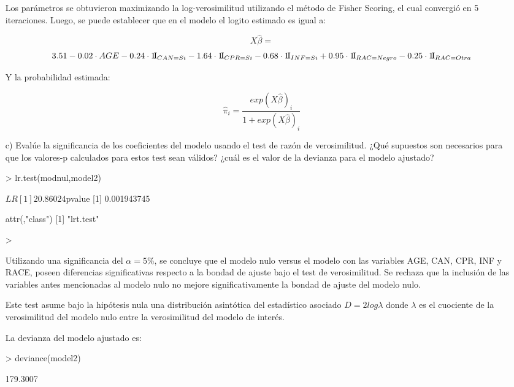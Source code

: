 \documentclass[11pt,onside]{article}
\begin{document}
\begin{itemize}
Los parámetros se obtuvieron maximizando la log-verosimilitud utilizando el método de Fisher Scoring, el cual convergió en 5 iteraciones. Luego, se puede establecer que en el modelo el logito estimado es igual a:

$$X \hat{\beta}=$$
$$3.51-0.02\cdot AGE-0.24\cdot \leavevmode\hbox{1\!\rm I}_{CAN=Si} -1.64 \cdot \leavevmode\hbox{1\!\rm I}_{CPR=Si}-0.68 \cdot \leavevmode\hbox{1\!\rm I}_{INF=Si}+0.95 \cdot \leavevmode\hbox{1\!\rm I}_{RAC=Negro}-0.25 \cdot \leavevmode\hbox{1\!\rm I}_{RAC=Otra}$$


Y la probabilidad estimada:

$$\hat{\pi}_{i}=\frac{exp(X \hat{\beta})_{i}} {1+exp(X \hat{\beta})_{i}}$$


\item[c)] Evalúe la significancia de los coeficientes del modelo usando el test de razón de verosimilitud. ¿Qué supuestos son necesarios para que los valores-p calculados para estos test sean válidos? ¿cuál es el valor de la devianza para el modelo ajustado?


\begin{Schunk}
\begin{Sinput}
> lr.test(modnul,model2)
\end{Sinput}
\begin{Soutput}
$LR
[1] 20.86024

$pvalue
[1] 0.001943745

attr(,"class")
[1] "lrt.test"
\end{Soutput}
\begin{Sinput}
> 
\end{Sinput}
\end{Schunk}

Utilizando una significancia del $\alpha=5\%$, se concluye que el modelo nulo versus el modelo con las variables AGE, CAN, CPR, INF y RACE, poseen diferencias significativas respecto a la bondad de ajuste bajo el test de verosimilitud. Se rechaza que la inclusión de las variables antes mencionadas al modelo nulo no mejore significativamente la bondad de ajuste del modelo nulo.


Este test asume bajo la hipótesis nula una distribución asintótica del estadístico asociado $D=2log\lambda$ donde $\lambda$ es el cuociente de la verosimilitud del modelo nulo entre la verosimilitud del modelo de interés.

La devianza del modelo ajustado es:

\begin{Schunk}
\begin{Sinput}
> deviance(model2)
\end{Sinput}
\begin{Soutput}
[1] 179.3007
\end{Soutput}
\end{Schunk}



\end{itemize}
\end{document}
